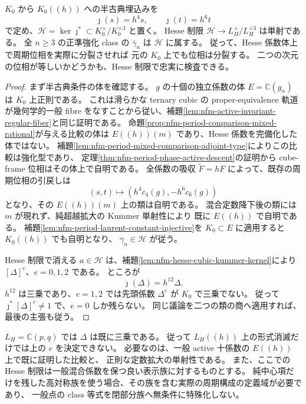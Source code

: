 \begin{proposition}
\label{prop:nfm-period-hesse-faithful-test}
$K_0$ から $K_0((h))$ への半古典埋込みを
\[
 \jmath(s)=h^4s,\qquad \jmath(t)=h^6t
\]
で定め、$\mathscr H=\ker\jmath^*\subset K_0^\times/K_0^{\times3}$ と置く。
Hesse 制限 $\mathscr H\to L_H^\times/L_H^{\times3}$ は単射である。
全 $n\ge3$ の正準強化 class の $\overline\gamma_n$ は $\mathscr H$ に属する。
従って、Hesse 係数体上で周期位相を実際に分裂させれば
元の $K_0$ 上でも位相は分裂する。
二つの次元の位相が等しいかどうかも、Hesse 制限で忠実に検査できる。
\end{proposition}
\begin{proof}
まず半古典条件の体を確認する。
$g$ の十個の独立係数の体 $E=\mathbb C(g_\alpha)$ は $K_0$ 上正則である。
これは滑らかな ternary cubic の proper-equivalence 軌道が幾何学的一般 fibre
をなすことから従い、補題\ref{lem:nfm-active-invariant-regular-fiber}と同じ証明である。
命題\ref{prop:nfm-period-comparison-mixed-rational}が与える比較の体は
$E((h))(m)$ であり、Hesse 係数を完備化した体ではない。
補題\ref{lem:nfm-period-mixed-comparison-adjoint-type}によりこの比較は強化型であり、
定理\ref{thm:nfm-period-phase-active-descent}の証明から
cube-frame 位相はその体上で自明である。
全係数の吸収 $\widetilde F=hF$ によって、既存の周期位相の引戻しは
\[
 (s,t)\longmapsto(h^4c_4(g),-h^6c_6(g))
\]
となり、その $E((h))(m)$ 上の類は自明である。
混合定数降下後の類には $m$ が現れず、純超越拡大の Kummer 単射性により
既に $E((h))$ で自明である。
補題\ref{lem:nfm-period-laurent-constant-injective}を $K_0\subset E$ に適用すると $K_0((h))$ でも自明となり、
$\overline\gamma_n\in\mathscr H$ が従う。

Hesse 制限で消える $a\in\mathscr H$ は、補題\ref{lem:nfm-hesse-cubic-kummer-kernel}により $[\Delta]^e$、$e=0,1,2$ である。
ところが
\[
 \jmath(\Delta)=h^{12}\Delta.
\]
$h^{12}$ は三乗であり、$e=1,2$ では先頭係数 $\Delta^e$ が $K_0$ で三乗でない。
従って $\jmath^*[\Delta]^e\ne1$ で、$e=0$ しか残らない。
同じ議論を二つの類の商へ適用すれば、最後の主張も従う。
\end{proof}

\begin{remark}
$L_H=\mathbb C(p,q)$ では $\Delta$ は既に三乗である。
従って $L_H((h))$ 上の形式消滅だけでは上の $e$ を決定できない。
必要なのは、一般 active 十係数の $E((h))$ 上で既に証明した比較と、
正則な定数拡大の単射性である。
また、ここでの Hesse 制限は一般混合係数を保つ良い表示族に対するものとする。
純中心項だけを残した高対称族を使う場合、その族を含む実際の周期構成の定義域が必要であり、
一般点の class 等式を閉部分族へ無条件に特殊化しない。
\end{remark}

